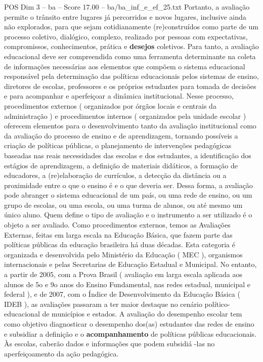 \begin{textsample}{POS Dim 3 – ba – Score 17.00 – ba/ba\_inf\_e\_ef\_25.txt}
Portanto, a avaliação permite o trânsito entre lugares já percorridos e novos lugares, inclusive ainda não explorados, para que sejam cotidianamente (re)construídos como parte de um processo coletivo, dialógico, complexo, realizado por pessoas com expectativas, compromissos, conhecimentos, prática e \textbf{desejos} coletivos.
Para tanto, a avaliação educacional deve ser compreendida como uma ferramenta determinante na coleta de informações necessárias aos elementos que compõem o sistema educacional responsável pela determinação das políticas educacionais pelos sistemas de ensino, diretores de escolas, professores e os próprios estudantes para tomada de decisões e para acompanhar e aperfeiçoar a dinâmica institucional.
Nesse processo, procedimentos externos ( organizados por órgãos locais e centrais da administração ) e procedimentos internos ( organizados pela unidade escolar ) oferecem elementos para o desenvolvimento tanto da avaliação institucional como da avaliação do processo de ensino e de aprendizagem, tornando possíveis a criação de políticas públicas, o planejamento de intervenções pedagógicas baseadas nas reais necessidades das escolas e dos estudantes, a identificação dos estágios de aprendizagem, a definição de materiais didáticos, a formação de educadores, a (re)elaboração de currículos, a detecção da distância ou a proximidade entre o que o ensino é e o que deveria ser.
Dessa forma, a avaliação pode abranger o sistema educacional de um país, ou uma rede de ensino, ou um grupo de escolas, ou uma escola, ou uma turma de alunos, ou até mesmo um único aluno.
Quem define o tipo de avaliação e o instrumento a ser utilizado é o objeto a ser avaliado.
Como procedimentos externos, temos as Avaliações Externas, feitas em larga escala na Educação Básica, que fazem parte das políticas públicas da educação brasileira há duas décadas.
Esta categoria é organizada e desenvolvida pelo Ministério da Educação ( MEC ), organismos internacionais e pelas Secretarias de Educação Estadual e Municipal.
No entanto, a partir de 2005, com a Prova Brasil ( avaliação em larga escala aplicada aos alunos de 5o e 9o anos do Ensino Fundamental, nas redes estadual, municipal e federal ), e de 2007, com o Índice de Desenvolvimento da Educação Básica ( IDEB ), as avaliações passaram a ter maior destaque no cenário político-educacional de municípios e estados.
A avaliação do desempenho escolar tem como objetivo diagnosticar o desempenho dos(as) estudantes das redes de ensino e subsidiar a definição e o \textbf{acompanhamento} de políticas públicas educacionais.
Às escolas, caberão dados e informações que podem subsidiá -las no aperfeiçoamento da ação pedagógica.

\end{textsample}
